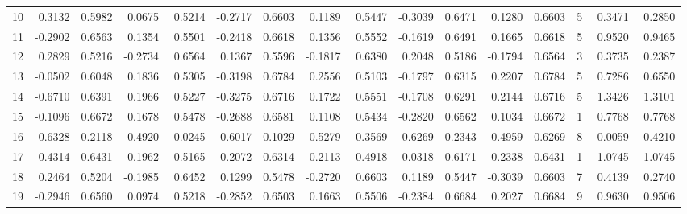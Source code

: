 \begin{tabular}{lrrrrrrrrrrrrrrr}
10 &      0.3132 &  0.5982 &  0.0675 &  0.5214 & -0.2717 &  0.6603 &  0.1189 &  0.5447 & -0.3039 &  0.6471 &   0.1280 &     0.6603 &      5 &                    0.3471 &                     0.2850 \\
11 &     -0.2902 &  0.6563 &  0.1354 &  0.5501 & -0.2418 &  0.6618 &  0.1356 &  0.5552 & -0.1619 &  0.6491 &   0.1665 &     0.6618 &      5 &                    0.9520 &                     0.9465 \\
12 &      0.2829 &  0.5216 & -0.2734 &  0.6564 &  0.1367 &  0.5596 & -0.1817 &  0.6380 &  0.2048 &  0.5186 &  -0.1794 &     0.6564 &      3 &                    0.3735 &                     0.2387 \\
13 &     -0.0502 &  0.6048 &  0.1836 &  0.5305 & -0.3198 &  0.6784 &  0.2556 &  0.5103 & -0.1797 &  0.6315 &   0.2207 &     0.6784 &      5 &                    0.7286 &                     0.6550 \\
14 &     -0.6710 &  0.6391 &  0.1966 &  0.5227 & -0.3275 &  0.6716 &  0.1722 &  0.5551 & -0.1708 &  0.6291 &   0.2144 &     0.6716 &      5 &                    1.3426 &                     1.3101 \\
15 &     -0.1096 &  0.6672 &  0.1678 &  0.5478 & -0.2688 &  0.6581 &  0.1108 &  0.5434 & -0.2820 &  0.6562 &   0.1034 &     0.6672 &      1 &                    0.7768 &                     0.7768 \\
16 &      0.6328 &  0.2118 &  0.4920 & -0.0245 &  0.6017 &  0.1029 &  0.5279 & -0.3569 &  0.6269 &  0.2343 &   0.4959 &     0.6269 &      8 &                   -0.0059 &                    -0.4210 \\
17 &     -0.4314 &  0.6431 &  0.1962 &  0.5165 & -0.2072 &  0.6314 &  0.2113 &  0.4918 & -0.0318 &  0.6171 &   0.2338 &     0.6431 &      1 &                    1.0745 &                     1.0745 \\
18 &      0.2464 &  0.5204 & -0.1985 &  0.6452 &  0.1299 &  0.5478 & -0.2720 &  0.6603 &  0.1189 &  0.5447 &  -0.3039 &     0.6603 &      7 &                    0.4139 &                     0.2740 \\
19 &     -0.2946 &  0.6560 &  0.0974 &  0.5218 & -0.2852 &  0.6503 &  0.1663 &  0.5506 & -0.2384 &  0.6684 &   0.2027 &     0.6684 &      9 &                    0.9630 &                     0.9506 \\
\bottomrule
\end{tabular}
